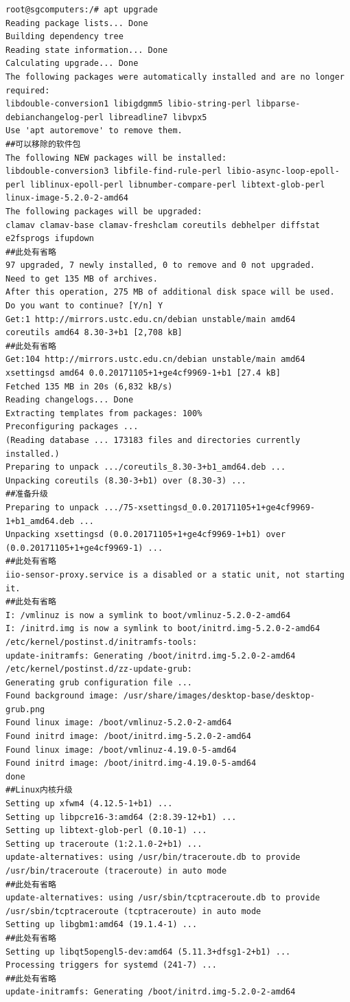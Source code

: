 \begin{verbatim}
root@sgcomputers:/# apt upgrade
Reading package lists... Done
Building dependency tree
Reading state information... Done
Calculating upgrade... Done
The following packages were automatically installed and are no longer required:
libdouble-conversion1 libigdgmm5 libio-string-perl libparse-debianchangelog-perl libreadline7 libvpx5
Use 'apt autoremove' to remove them.
##可以移除的软件包
The following NEW packages will be installed:
libdouble-conversion3 libfile-find-rule-perl libio-async-loop-epoll-perl liblinux-epoll-perl libnumber-compare-perl libtext-glob-perl linux-image-5.2.0-2-amd64
The following packages will be upgraded:
clamav clamav-base clamav-freshclam coreutils debhelper diffstat e2fsprogs ifupdown 
##此处有省略
97 upgraded, 7 newly installed, 0 to remove and 0 not upgraded.
Need to get 135 MB of archives.
After this operation, 275 MB of additional disk space will be used.
Do you want to continue? [Y/n] Y
Get:1 http://mirrors.ustc.edu.cn/debian unstable/main amd64 
coreutils amd64 8.30-3+b1 [2,708 kB]
##此处有省略
Get:104 http://mirrors.ustc.edu.cn/debian unstable/main amd64 
xsettingsd amd64 0.0.20171105+1+ge4cf9969-1+b1 [27.4 kB]
Fetched 135 MB in 20s (6,832 kB/s)
Reading changelogs... Done
Extracting templates from packages: 100%
Preconfiguring packages ...
(Reading database ... 173183 files and directories currently installed.)
Preparing to unpack .../coreutils_8.30-3+b1_amd64.deb ...
Unpacking coreutils (8.30-3+b1) over (8.30-3) ...
##准备升级
Preparing to unpack .../75-xsettingsd_0.0.20171105+1+ge4cf9969-1+b1_amd64.deb ...
Unpacking xsettingsd (0.0.20171105+1+ge4cf9969-1+b1) over (0.0.20171105+1+ge4cf9969-1) ...
##此处有省略
iio-sensor-proxy.service is a disabled or a static unit, not starting it.
##此处有省略
I: /vmlinuz is now a symlink to boot/vmlinuz-5.2.0-2-amd64
I: /initrd.img is now a symlink to boot/initrd.img-5.2.0-2-amd64
/etc/kernel/postinst.d/initramfs-tools:
update-initramfs: Generating /boot/initrd.img-5.2.0-2-amd64
/etc/kernel/postinst.d/zz-update-grub:
Generating grub configuration file ...
Found background image: /usr/share/images/desktop-base/desktop-grub.png
Found linux image: /boot/vmlinuz-5.2.0-2-amd64
Found initrd image: /boot/initrd.img-5.2.0-2-amd64
Found linux image: /boot/vmlinuz-4.19.0-5-amd64
Found initrd image: /boot/initrd.img-4.19.0-5-amd64
done
##Linux内核升级
Setting up xfwm4 (4.12.5-1+b1) ...
Setting up libpcre16-3:amd64 (2:8.39-12+b1) ...
Setting up libtext-glob-perl (0.10-1) ...
Setting up traceroute (1:2.1.0-2+b1) ...
update-alternatives: using /usr/bin/traceroute.db to provide 
/usr/bin/traceroute (traceroute) in auto mode
##此处有省略
update-alternatives: using /usr/sbin/tcptraceroute.db to provide 
/usr/sbin/tcptraceroute (tcptraceroute) in auto mode
Setting up libgbm1:amd64 (19.1.4-1) ...
##此处有省略
Setting up libqt5opengl5-dev:amd64 (5.11.3+dfsg1-2+b1) ...
Processing triggers for systemd (241-7) ...
##此处有省略
update-initramfs: Generating /boot/initrd.img-5.2.0-2-amd64
\end{verbatim}
